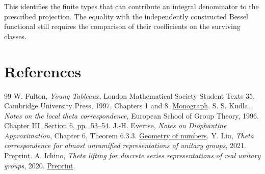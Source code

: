 \documentclass[a4paper,11pt]{article}
\theoremstyle{definition}
\theoremstyle{remark}
\numberwithin{equation}{section}
\begin{document}
This identifies the finite types that can contribute an integral
denominator to the prescribed projection. The equality with the
independently constructed Bessel functional still requires the
comparison of their coefficients on the surviving classes.

\clearpage
\section{References}\label{nav:bibliography-XXIII}
\begingroup{}\begin{thebibliography}{99}\small
{} W. Fulton, \emph{Young Tableaux}, London Mathematical Society Student Texts 35, Cambridge University Press, 1997, Chapters 1 and 8. \href{https://www.cambridge.org/core/books/young-tableaux/A7570B10D82AE7233E25E5D6F70A07B6}{Monograph}.
 S. S. Kudla, \emph{Notes on the local theta correspondence}, European School of Group Theory, 1996. \href{https://www.math.toronto.edu/skudla/castle.pdf}{Chapter III, Section 6, pp.~53--54}.
 J.-H. Evertse, \emph{Notes on Diophantine Approximation}, Chapter 6, Theorem 6.3.3. \href{https://www.math.leidenuniv.nl/~evertsejh/Minkowski.pdf}{Geometry of numbers}.
 Y. Liu, \emph{Theta correspondence for almost unramified representations of unitary groups}, 2021. \href{https://arxiv.org/abs/2105.14223}{Preprint}.
 A. Ichino, \emph{Theta lifting for discrete series representations of real unitary groups}, 2020. \href{https://arxiv.org/abs/2002.09148}{Preprint}.
\end{thebibliography}\endgroup
\end{document}
